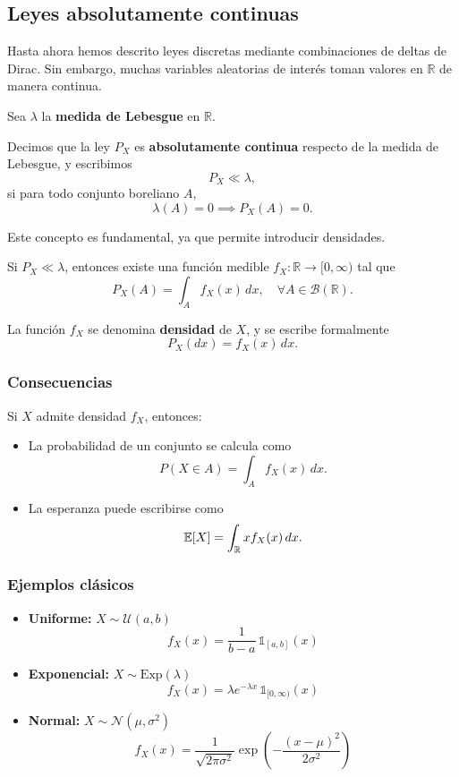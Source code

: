 \subsection{Leyes absolutamente continuas}

Hasta ahora hemos descrito leyes discretas mediante combinaciones de deltas de Dirac. Sin embargo, muchas variables aleatorias de interés toman valores en $\mathbb{R}$ de manera continua.

Sea $\lambda$ la \textbf{medida de Lebesgue} en $\mathbb{R}$.

\begin{defi}
Decimos que la ley $P_X$ es \textbf{absolutamente continua} respecto de la medida de Lebesgue, y escribimos
\[
P_X \ll \lambda,
\]
si para todo conjunto boreliano $A$,
\[
\lambda(A) = 0 \implies P_X(A) = 0.
\]
\end{defi}

Este concepto es fundamental, ya que permite introducir densidades.

\begin{teo}
Si $P_X \ll \lambda$, entonces existe una función medible $f_X:\mathbb{R} \to [0,\infty)$ tal que
\[
P_X(A) = \int_A f_X(x)\,dx, \quad \forall A \in \mathcal{B}(\mathbb{R}).
\]
\end{teo}

La función $f_X$ se denomina \textbf{densidad} de $X$, y se escribe formalmente
\[
P_X(dx) = f_X(x)\,dx.
\]

\subsubsection*{Consecuencias}

Si $X$ admite densidad $f_X$, entonces:

\begin{itemize}
\item La probabilidad de un conjunto se calcula como
\[
P(X \in A) = \int_A f_X(x)\,dx.
\]

\item La esperanza puede escribirse como
\[
\mathbb{E}[X] = \int_{\mathbb{R}} x f_X(x)\,dx.
\]
\end{itemize}

\subsubsection*{Ejemplos clásicos}

\begin{itemize}
\item \textbf{Uniforme:} $X \sim \mathcal{U}(a,b)$
\[
f_X(x) = \frac{1}{b-a}\,\mathbb{1}_{[a,b]}(x)
\]

\item \textbf{Exponencial:} $X \sim \mathrm{Exp}(\lambda)$
\[
f_X(x) = \lambda e^{-\lambda x}\,\mathbb{1}_{[0,\infty)}(x)
\]

\item \textbf{Normal:} $X \sim \mathcal{N}(\mu,\sigma^2)$
\[
f_X(x) = \frac{1}{\sqrt{2\pi\sigma^2}}
\exp\left(-\frac{(x-\mu)^2}{2\sigma^2}\right)
\]
\end{itemize}

